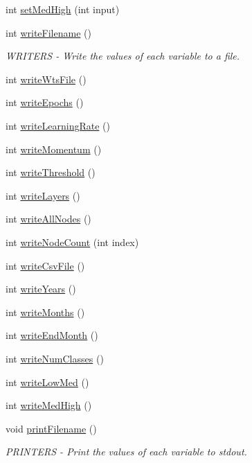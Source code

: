 \begin{DoxyCompactItemize}
\item 
int \hyperlink{classPrm_a99f9bef0b18293ecda0b4c58791aa096}{set\-Med\-High} (int input)
\item 
int \hyperlink{classPrm_a7c95d54b838af5cc5eb1a546340ad66d}{write\-Filename} ()
\begin{DoxyCompactList}\small\item\em W\-R\-I\-T\-E\-R\-S -\/ Write the values of each variable to a file. \end{DoxyCompactList}\item 
int \hyperlink{classPrm_a2d1fba043a69ff4452b1a3bda1c71c52}{write\-Wts\-File} ()
\item 
int \hyperlink{classPrm_a58398324312e3e653e8b345a3aebfc43}{write\-Epochs} ()
\item 
int \hyperlink{classPrm_a3b1b6521204140b6c56d450b771ebbee}{write\-Learning\-Rate} ()
\item 
int \hyperlink{classPrm_aabaeb35ae81344d55328566ed87f164c}{write\-Momentum} ()
\item 
int \hyperlink{classPrm_a49ec98de3482d89d6e9b9cde1444e13e}{write\-Threshold} ()
\item 
int \hyperlink{classPrm_a8e0729394c469d69718a761bf775a80c}{write\-Layers} ()
\item 
int \hyperlink{classPrm_a6082faed8463f87ea3f73094163b98cb}{write\-All\-Nodes} ()
\item 
int \hyperlink{classPrm_a98a553c1569c81741e8f541cd505bb26}{write\-Node\-Count} (int index)
\item 
int \hyperlink{classPrm_a7d7d954ff00075c6526138b772fc8a97}{write\-Csv\-File} ()
\item 
int \hyperlink{classPrm_afc37b6607442651ad6e04074d00039ba}{write\-Years} ()
\item 
int \hyperlink{classPrm_acefc4ca96b2c091cb8d62a1ba160df55}{write\-Months} ()
\item 
int \hyperlink{classPrm_afbd0a72bad12af497fc5db7f0f85dfe0}{write\-End\-Month} ()
\item 
int \hyperlink{classPrm_adaf097f098366dc34e71824ffcb020c2}{write\-Num\-Classes} ()
\item 
int \hyperlink{classPrm_a07f1dd78bdcb6202c2e99c3bbb4a447f}{write\-Low\-Med} ()
\item 
int \hyperlink{classPrm_ad3134a2c27c3910ae01d63ebb475c76d}{write\-Med\-High} ()
\item 
void \hyperlink{classPrm_afe55d01fb0f14f27ea5fe65a4fae2427}{print\-Filename} ()
\begin{DoxyCompactList}\small\item\em P\-R\-I\-N\-T\-E\-R\-S -\/ Print the values of each variable to stdout. \end{DoxyCompactList}\item 

\end{DoxyCompactItemize}
